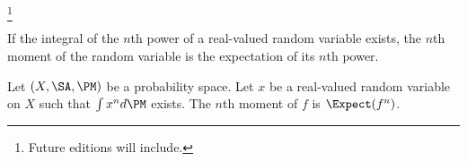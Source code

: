 
\footnote{Future editions will include.}


If the integral of the $n$th power of a real-valued random variable exists, the \t{$n$th moment} of the random variable is the expectation of its $n$th power.


Let $(X, \SA, \PM)$ be a probability space.
Let $x$ be a real-valued random variable on $X$ such that $\int x^n d\PM$ exists.
The $n$th moment of $f$ is $\Expect(f^n)$.

\blankpage
